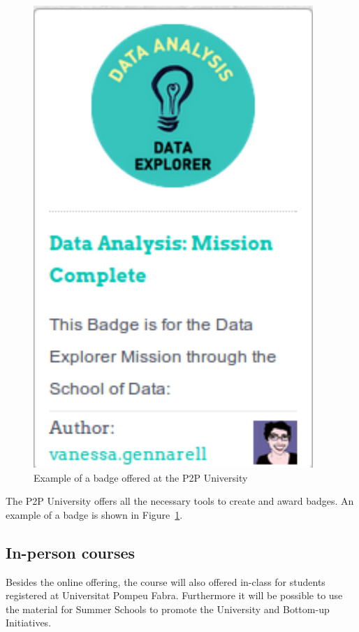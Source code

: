 \documentclass[a4paper,oneside]{book}   %
\begin{document}
\begin{figure}
\begin{center}
\includegraphics[width=0.40\linewidth]{badge}
\caption{Example of a badge offered at the P2P University}
\label{fig:badge}
\end{center}
\end{figure}

The P2P University offers all the necessary tools to create and award badges.
An example of a badge is shown in Figure~\ref{fig:badge}.



\subsection{In-person courses}
Besides the online offering, the course will also offered in-class for students registered at Universitat Pompeu Fabra.
Furthermore it will be possible to use the material for Summer Schools to promote the University and Bottom-up Initiatives.
\end{document}
